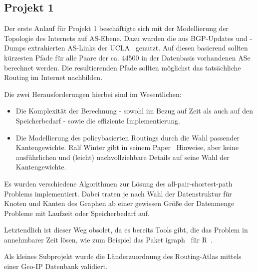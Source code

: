 \subsection{Projekt 1}
Der erste Anlauf für Projekt 1 beschäftigte sich mit der Modellierung der Topologie des Internets auf AS-Ebene.
Dazu wurden die aus BGP-Updates und -Dumps extrahierten AS-Links der UCLA~\cite{ucla-topology, Zhang:2005:CIA:1052812.1052825} genutzt.
Auf diesen basierend sollten kürzesten Pfade für alle Paare der ca. 44500 in der Datenbasis vorhandenen ASe berechnet werden. %
Die resultierenden Pfade sollten möglichst das tatsächliche Routing im Internet nachbilden.

Die zwei Herausforderungen hierbei sind im Wesentlichen:
\begin{itemize}
  \item Die Komplexität der Berechnung - sowohl im Bezug auf Zeit als auch auf den Speicherbedarf - sowie die effiziente Implementierung.
  \item Die Modellierung des policybasierten Routings durch die Wahl passender Kantengewichte. Ralf Winter gibt in seinem Paper~\cite{Winter:2009:MIR:1577959.1577976} Hinweise, aber keine ausführlichen und (leicht) nachvollziehbare Details auf seine Wahl der Kantengewichte.
\end{itemize}

Es wurden verschiedene Algorithmen zur Lösung des all-pair-shortest-path Problems implementiert.
Dabei traten je nach Wahl der Datenstruktur für Knoten und Kanten des Graphen ab einer gewissen Größe der Datenmenge Probleme mit Laufzeit oder Speicherbedarf auf.

Letztendlich ist dieser Weg obsolet, da es bereits Tools gibt, die das Problem in annehmbarer Zeit lösen, wie zum Beispiel das Paket igraph~\cite{r-igraph} für R~\cite{r}.

Als kleines Subprojekt wurde die Länderzuordnung des Routing-Atlas mittels einer Geo-IP Datenbank validiert.

